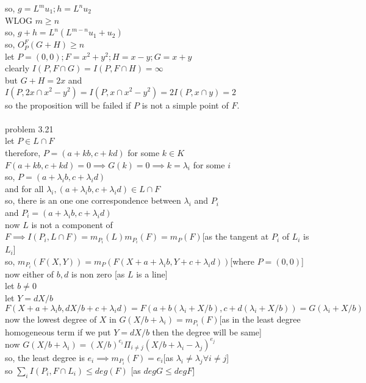 \documentclass[11pt]{amsart}
\theoremstyle{definition}
\begin{document}
so, $g=L^mu_1;h=L^nu_2$\\
WLOG $m\geq n$\\
so, $g+h=L^n(L^{m-n}u_1+u_2)$\\
so, $O_P^F(G+H)\geq n$\\
let $P=(0,0);F=x^2+y^2;H=x-y;G=x+y$\\
clearly $I(P,F\cap G)=I(P,F\cap H)=\infty$\\
but $G+H=2x$ and $ I(P,2x\cap x^2-y^2)=I(P,x\cap x^2-y^2)=2I(P,x\cap y)=2$\\
so the proposition will be failed if $P$ is not a simple point of $F$.\\\\
problem 3.21\\
let $P\in L\cap F$\\
therefore, $P=(a+kb,c+kd)$ for some $k\in K$\\
$F(a+kb,c+kd)=0\implies G(k)=0\implies k=\lambda_i$ for some $i$\\
so, $P=(a+\lambda_ib,c+\lambda_id)$\\
and for all $\lambda_i,(a+\lambda_ib,c+\lambda_id)\in L\cap F$\\
so, there is an one one correspondence between $\lambda_i$ and $P_i$\\
and $P_i=(a+\lambda_ib,c+\lambda_id)$\\
now $L$ is not a component of $F\implies I(P_i,L\cap F)=m_{P_i}(L)m_{P_i}(F)=m_P(F)$[as the tangent at $P_i$ of $L_i$ is $L_i$]\\
so, $m_{P_i}(F(X,Y))=m_P(F(X+a+\lambda_ib,Y+c+\lambda_id))$[where $P=(0,0)$]\\
now either of $b,d$ is non zero [as $L$ is a line]\\
let $b\neq 0$\\
let $Y=dX/b$\\
$F(X+a+\lambda_ib,dX/b+c+\lambda_id)=F(a+b(\lambda_i+X/b),c+d(\lambda_i+X/b))=G(\lambda_i+X/b)$\\
now the lowest degree of $X$ in $G(X/b+\lambda_i)=m_{P_i}(F)$[as in the least degree homogeneous term if we put $Y=dX/b$ then the degree will be same]\\
now $G(X/b+\lambda_i)=(X/b)^{e_i}\Pi_{i\neq j}(X/b+\lambda_i-\lambda_j)^{e_j}$\\
so, the least degree is $e_i\implies m_{P_i}(F)=e_i$[as $\lambda_i\neq \lambda_j\forall i\neq j$]\\
so $\sum_{i}I(P_i,F\cap L_i)\leq deg (F)$ [as $deg G\leq deg F]$\\\\
\end{document}
